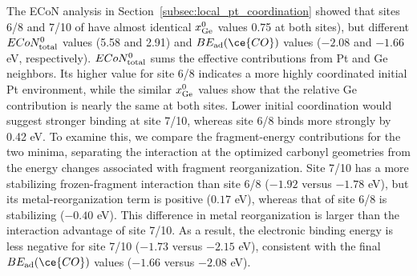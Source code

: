 The ECoN analysis in Section~\ref{subsec:local_pt_coordination} showed that
sites 6/8 and 7/10 of  have almost identical
$x_{\rm Ge}^{0}$ values 0.75 at both sites), but different
$ECoN_{\rm total}^{0}$ values (5.58 and 2.91) and
$BE_{\rm ad}(\ce{CO})$ values ($-2.08$ and $-1.66$ eV, respectively).
$ECoN_{\rm total}^{0}$ sums the effective contributions from Pt and Ge
neighbors. Its higher value for site 6/8 indicates a more highly coordinated
initial Pt environment, while the similar $x_{\rm Ge}^{0}$ values show that
the relative Ge contribution is nearly the same at both sites.
Lower initial coordination would suggest stronger binding
at site 7/10, whereas site 6/8 binds  more strongly by 0.42 eV.
To examine this, we compare the fragment-energy
contributions for the two minima, separating the interaction at the optimized
carbonyl geometries from the energy changes associated with fragment
reorganization. Site 7/10 has a
more stabilizing frozen-fragment interaction than site 6/8
($-1.92$ versus $-1.78$ eV), but its metal-reorganization term is positive
($0.17$ eV), whereas that of site 6/8 is stabilizing ($-0.40$ eV). This
difference in metal reorganization is larger than the interaction advantage
of site 7/10. As a result, the electronic binding energy is less negative
for site 7/10 ($-1.73$ versus $-2.15$ eV), consistent with the final
$BE_{\rm ad}(\ce{CO})$ values ($-1.66$ versus $-2.08$ eV).


